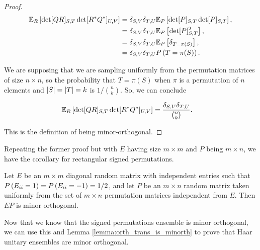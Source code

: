 \begin{proof}
    \begin{align*}
        \mathbb E_R \left[ \det[QR]_{S,T}\det[\hermit{R}\hermit{Q}]_{U,V} \right] &= \delta_{S,V} \delta_{T,U} \mathbb E_{P}\left[ \det [P]_{S,T}\det[P]_{S,T} \right],\\ 
        &= \delta_{S,V} \delta_{T,U} \mathbb E_{P}\left[ \det [P]_{S,T}^2 \right],\\ 
        &= \delta_{S,V} \delta_{T,U} \mathbb E_{P}\left[  \delta_{T=\pi(S)} \right], \\ 
        &= \delta_{S,V} \delta_{T,U} \P{T = \pi(S)}.
    \end{align*}

    We are supposing that we are sampling uniformly from the permutation matrices of size $n \times n$, so the probability that $T = \pi(S)$ when $\pi$ is a permutation of $n$ elements and $\abs{S} = \abs{T} = k$ is $1/\binom{n}{k}$. So, we can conclude

    \begin{align*}
        \mathbb E_R \left[ \det[QR]_{S,T}\det[\hermit{R}\hermit{Q}]_{U,V} \right] &= \frac{\delta_{S,V} \delta_{T,U}}{\binom{n}{k}}.
    \end{align*}

    This is the definition of being minor-orthogonal. 
\end{proof}

Repeating the former proof but with $E$ having size $m\times m$ and $P$ being $m\times n$, we have the corollary for rectangular signed permutations.

\begin{corollary}
    Let $E$ be an $m\times m$ diagonal random matrix with independent entries such that $\P{E_{ii} = 1} = \P{E_{ii} = -1} = 1/2$, and let $P$ be an $m\times n$ random matrix taken uniformly from the set of $m\times n$ permutation matrices independent from $E$. Then $EP$ is minor orthogonal.
\end{corollary}

Now that we know that the signed permutations ensemble is minor orthogonal, we can use this and Lemma \ref{lemma:orth_trans_is_minorth} to prove that Haar unitary ensembles are minor orthogonal.


